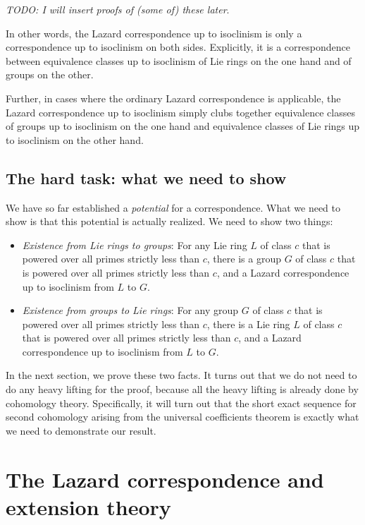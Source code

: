 {\em TODO: I will insert proofs of (some of) these later}.

In other words, the Lazard correspondence up to isoclinism is only a
correspondence up to isoclinism on both sides. Explicitly, it is a
correspondence between equivalence classes up to isoclinism of Lie
rings on the one hand and of groups on the other.

Further, in cases where the ordinary Lazard correspondence is
applicable, the Lazard correspondence up to isoclinism simply clubs
together equivalence classes of groups up to isoclinism on the one
hand and equivalence classes of Lie rings up to isoclinism on the
other hand.

\subsection{The hard task: what we need to show}

We have so far established a {\em potential} for a
correspondence. What we need to show is that this potential is actually
realized. We need to show two things:

\begin{itemize}
\item {\em Existence from Lie rings to groups}: For any Lie ring $L$
  of class $c$ that is powered over all primes strictly less than $c$,
  there is a group $G$ of class $c$ that is powered over all primes
  strictly less than $c$, and a Lazard correspondence up to isoclinism from $L$ to $G$.
\item {\em Existence from groups to Lie rings}: For any group $G$ of
  class $c$ that is powered over all primes strictly less than $c$,
  there is a Lie ring $L$ of class $c$ that is powered over all primes
  strictly less than $c$, and a Lazard correspondence up to isoclinism
  from $L$ to $G$.
\end{itemize}

In the next section, we prove these two facts. It turns out that we do
not need to do any heavy lifting for the proof, because all the heavy
lifting is already done by cohomology theory. Specifically, it will
turn out that the short exact sequence for second cohomology arising
from the universal coefficients theorem is exactly what we need to
demonstrate our result.

\section{The Lazard correspondence and extension theory}

